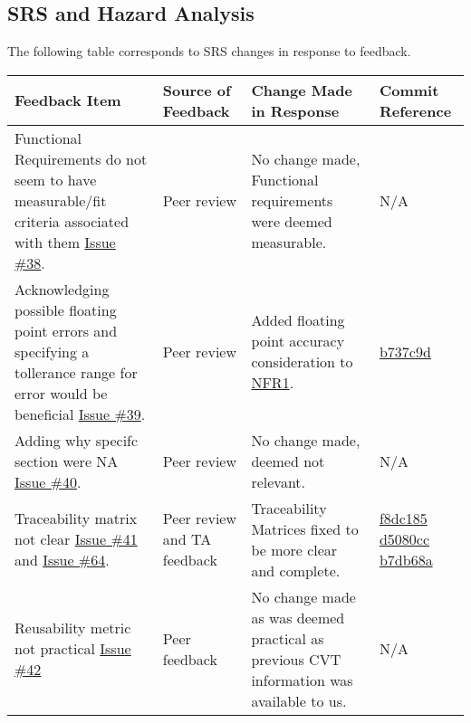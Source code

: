 \documentclass{article}
\begin{document}

\subsection{SRS and Hazard Analysis}

The following table corresponds to SRS changes in response to feedback.

    \begin{longtable}{|p{4cm}|p{1.5cm}|p{4cm}|p{1.5cm}|}
    \hline
    \textbf{Feedback Item} & \textbf{Source of Feedback} & \textbf{Change Made in Response} & \textbf{Commit Reference} \\
    \hline
    \endfirsthead
    \hline
    \endhead
    \hline
    \endfoot
    \hline
    \endlastfoot
    Functional Requirements do not seem to have measurable/fit criteria associated with them \href{https://github.com/gr812b/CVT-Simulator/issues/38}{Issue \#38}. & Peer review  & No change made, Functional requirements were deemed measurable. & N/A \\
    \hline 
    Acknowledging possible floating point errors and specifying a tollerance range for error would be beneficial \href{https://github.com/gr812b/CVT-Simulator/issues/39}{Issue \#39}. & Peer review  & Added floating point accuracy consideration to \href{https://github.com/gr812b/CVT-Simulator/blob/main/docs/SRS/SRS.pdf}{NFR1}. 
    & \href{https://github.com/gr812b/CVT-Simulator/commit/b737c9dca12893fff6071cc0cf9fcc4c4b4d7a93}{b737c9d} \\
   
    \hline 
    Adding why specifc section were NA \href{https://github.com/gr812b/CVT-Simulator/issues/40}{Issue \#40}. & Peer review & No change made, deemed not relevant. & N/A\\
    \hline
    Traceability matrix not clear \href{https://github.com/gr812b/CVT-Simulator/issues/41}{Issue \#41} and \href{https://github.com/gr812b/CVT-Simulator/issues/64}{Issue \#64}. & Peer review and TA feedback & Traceability Matrices fixed to be more clear and complete.
    & \href{https://github.com/gr812b/CVT-Simulator/commit/f8dc185e533e52c5260595c5b1c8d48bb4db3ff8}{f8dc185}  
    \href{https://github.com/gr812b/CVT-Simulator/commit/d5080cc95e629483f81ea46df03fbcc2f9c454eb}{d5080cc}  
    \href{https://github.com/gr812b/CVT-Simulator/commit/b7db68a977e81676ac26ccea8c662e55feb7d087}{b7db68a} 
    \\
    \hline
    Reusability metric not practical \href{https://github.com/gr812b/CVT-Simulator/issues/42}{Issue \#42} & Peer feedback & No change made as was deemed practical as previous CVT information was available to us. & N/A\\


\end{longtable}
\end{document}
